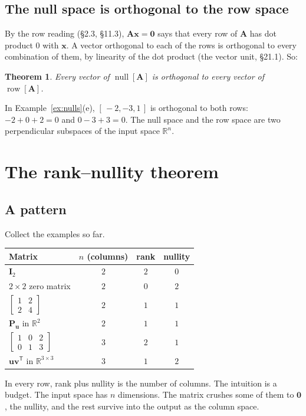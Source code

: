 \documentclass[11pt]{article}
\theoremstyle{plain}
\newtheorem{thm}{Theorem}[section]
\theoremstyle{definition}
\theoremstyle{remark}
\newcommand{\R}{\mathbb{R}}
\newcommand{\vc}[1]{\mathbf{#1}}
\newcommand{\mt}[1]{\mathbf{#1}}
\newcommand{\T}{^{\mathsf{T}}}
\newcommand{\smat}[1]{\left[\begin{smallmatrix}#1\end{smallmatrix}\right]}
\newcommand{\rowsp}[1]{\operatorname{row}[#1]}
\newcommand{\nullsp}[1]{\operatorname{null}[#1]}
\begin{document}
\subsection{The null space is orthogonal to the row space}
By the row reading (\S2.3, \S11.3), $\mt{A}\vc{x}=\vc{0}$ says that every row of
$\mt{A}$ has dot product $0$ with $\vc{x}$. A vector orthogonal to each of the
rows is orthogonal to every combination of them, by linearity of the dot product
(the vector unit, \S21.1). So:

\begin{thm}
\label{thm:nullperp}
Every vector of $\nullsp{\mt{A}}$ is orthogonal to every vector of
$\rowsp{\mt{A}}$.
\end{thm}

\noindent In Example~\ref{ex:nulls}(e), $[\,-2,-3,1\,]$ is orthogonal to both rows:
$-2+0+2=0$ and $0-3+3=0$. The null space and the row space are two
perpendicular subspaces of the input space $\R^{n}$.

\section{The rank--nullity theorem}

\subsection{A pattern}
Collect the examples so far.
\begin{center}
\renewcommand{\arraystretch}{1.3}
\begin{tabular}{@{}l c c c@{}}
\toprule
\textbf{Matrix} & $n$ (columns) & rank & nullity \\
\midrule
$\mt{I}_2$ & $2$ & $2$ & $0$ \\
$2\times2$ zero matrix & $2$ & $0$ & $2$ \\
$\smat{1&2\\2&4}$ & $2$ & $1$ & $1$ \\
$\mt{P}_{\vc{u}}$ in $\R^{2}$ & $2$ & $1$ & $1$ \\
$\smat{1&0&2\\0&1&3}$ & $3$ & $2$ & $1$ \\
$\vc{u}\vc{v}\T$ in $\R^{3\times3}$ & $3$ & $1$ & $2$ \\
\bottomrule
\end{tabular}
\end{center}
In every row, rank plus nullity is the number of columns. The intuition is a
budget. The input space has $n$ dimensions. The matrix crushes some of them to
$\vc{0}$, the nullity, and the rest survive into the output as the column
space.
\end{document}
